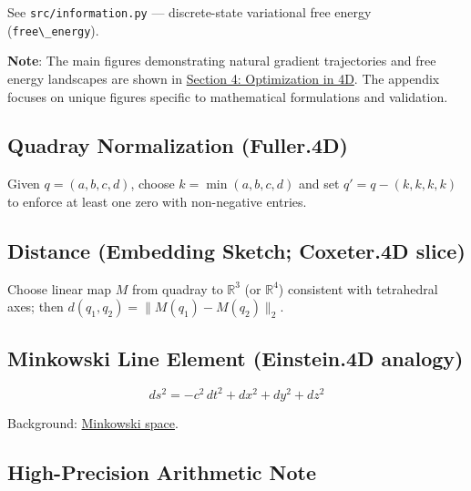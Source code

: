 \documentclass[
  10pt,
]{article}
\newcommand{\passthrough}[1]{#1}
\begin{document}
See \passthrough{\lstinline!src/information.py!} --- discrete-state
variational free energy (\passthrough{\lstinline!free\_energy!}).

\textbf{Note}: The main figures demonstrating natural gradient
trajectories and free energy landscapes are shown in
\href{04_optimization_in_4d.md}{Section 4: Optimization in 4D}. The
appendix focuses on unique figures specific to mathematical formulations
and validation.

\hypertarget{quadray-normalization-fuller.4d}{%
\subsection{Quadray Normalization
(Fuller.4D)}\label{quadray-normalization-fuller.4d}}

Given \(q=(a,b,c,d)\), choose \(k=\min(a,b,c,d)\) and set
\(q' = q - (k,k,k,k)\) to enforce at least one zero with non-negative
entries.

\hypertarget{distance-embedding-sketch-coxeter.4d-slice}{%
\subsection{Distance (Embedding Sketch; Coxeter.4D
slice)}\label{distance-embedding-sketch-coxeter.4d-slice}}

Choose linear map \(M\) from quadray to \(\mathbb{R}^3\) (or
\(\mathbb{R}^4\)) consistent with tetrahedral axes; then
\(d(q_1,q_2) = \lVert M(q_1) - M(q_2) \rVert_2\).

\hypertarget{minkowski-line-element-einstein.4d-analogy}{%
\subsection{Minkowski Line Element (Einstein.4D
analogy)}\label{minkowski-line-element-einstein.4d-analogy}}

\begin{equation}\label{eq:minkowski_line_element}
ds^2 = -c^2\,dt^2 + dx^2 + dy^2 + dz^2
\end{equation}

Background:
\href{https://en.wikipedia.org/wiki/Minkowski_space}{Minkowski space}.

\hypertarget{high-precision-arithmetic-note}{%
\subsection{High-Precision Arithmetic
Note}\label{high-precision-arithmetic-note}}
\end{document}
